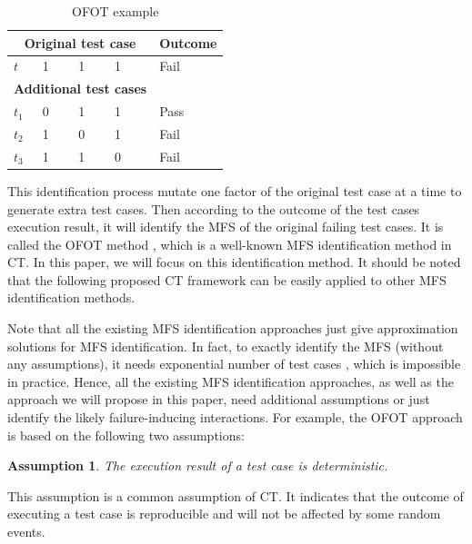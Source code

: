 \documentclass[10pt,journal,compsoc]{IEEEtran}
\begin{document}
\begin{table}[!t]
\caption{OFOT example}
\label{ofot-identify}
\centering
\begin{tabular}{llllll}
 \hline
\multicolumn{5}{c}{\bfseries Original test case} & \bfseries Outcome \\  \hline
 $t$ & \multicolumn{4}{l}{1 \ \ \ \ 1 \ \ \ \  1 } & Fail \\
 \hline
\multicolumn{5}{c}{\bfseries Additional  test cases} &  \\  \hline
$t_{1}$ &\multicolumn{4}{l}{0  \ \ \ \  1 \ \ \ \  1 }& Pass \\
$t_{2}$ &\multicolumn{4}{l}{1  \ \ \ \  0 \ \ \ \  1 } & Fail \\
$t_{3}$ &\multicolumn{4}{l}{1  \ \ \ \  1 \ \ \ \  0 } & Fail \\
 \hline
\end{tabular}
\end{table}

This identification process mutate one factor of the original test case at a time to generate extra test cases. Then according to the outcome of the test cases execution result, it will identify the MFS of the original failing test cases. It is called the OFOT method \cite{nie2011minimal}, which is a well-known MFS identification method in CT. In this paper, we will focus on this identification method. It should be noted that the following proposed CT framework can be easily applied to other MFS identification methods.

Note that all the existing MFS identification approaches just give approximation solutions for MFS identification. In fact, to exactly identify the MFS (without any assumptions), it needs exponential number of test cases \cite{niu2013identifying}, which is impossible in practice. Hence, all the existing MFS identification approaches, as well as the approach we will propose in this paper, need additional assumptions or just identify the likely failure-inducing interactions. For example, the OFOT approach is based on the following two assumptions:
\newtheorem{assumption}{Assumption}
\begin{assumption}  The execution result of a test case is deterministic.
\end{assumption}

This assumption is a common assumption of CT\cite{zhang2011characterizing,ghandehari2012identifying,niu2013identifying}. It indicates that the outcome of executing a test case is reproducible and will not be affected by some random events.
\end{document}
